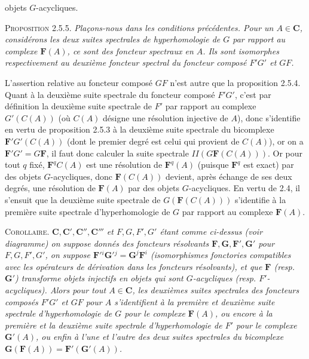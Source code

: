 
\noindent objets $G$-acycliques.

\textsc{Proposition 2.5.5.} \textit{Plaçons-nous dans les
conditions précédentes. Pour un $A\in \mathbf C$, considérons les deux suites
spectrales de hyperhomologie de $G$ par rapport au complexe $\mathbf F(A)$,
ce sont des foncteur spectraux en $A$. Ils sont isomorphes respectivement au
deuxième foncteur spectral du foncteur composé $F'G'$ et $GF$.}

L'assertion relative au foncteur composé $GF$ n'est autre que la proposition
2.5.4. Quant à la deuxième suite spectrale du foncteur composé $F'G'$, c'est
par définition la deuxième suite spectrale de $F'$ par rapport au complexe
$G'(C(A))$ (où $C(A)$ désigne une résolution injective de $A$), donc
s'identifie en vertu de proposition 2.5.3 à la deuxième suite spectrale du
bicomplexe $\mathbf F'G'(C(A))$ (dont le premier degré est celui qui provient
de $C(A)$), or on a $\mathbf F'G'=G\mathbf F$, il faut donc calculer la suite
spectrale $II(G\mathbf F(C(A)))$. Or pour tout $q$ fixé,
$\mathbf F^qC(A)$ est une résolution de $\mathbf F^q(A)$ (puisque
$\mathbf F^q$ est exact) par des objets $G$-acycliques, donc
$\mathbf F(C(A))$ devient, après échange de ses deux degrés, une résolution
de $\mathbf F(A)$ par des objets $G$-acycliques. En vertu de 2.4, il
s'ensuit que la deuxième suite spectrale de $G(\mathbf F(C(A)))$ s'identifie
à la première suite spectrale d'hyperhomologie de $G$ par rapport au complexe
$\mathbf F(A)$.

\textsc{Corollaire.} \textit{$\mathbf C,\mathbf C',\mathbf C'',\mathbf C'''$ et $F,G,F',G'$
étant comme ci-dessus \textup{(}voir diagramme\textup{)} on suppose donnés des foncteurs
résolvants $\mathbf F,\mathbf G,\mathbf F',\mathbf G'$ pour $F,G,F',G'$, on
suppose $\mathbf F'{}^i\mathbf G'{}^j=\mathbf G^j\mathbf F^i$ \textup{(}isomorphismes fonctories
compatibles avec les opérateurs de dérivation dans les foncteurs résolvants\textup{)},
et que $\mathbf F$ \textup{(}resp. $\mathbf G'$\textup{)} transforme objets injectifs en objets qui sont
$G$-acycliques \textup{(}resp. $F'$-acycliques\textup{)}. Alors pour tout $A\in \mathbf C$, les
deuxièmes suites spectrales des foncteurs composés $F'G'$ et $GF$ pour $A$
s'identifient à la première et deuxième suite spectrale d'hyperhomologie de
$G$ pour le complexe $\mathbf F(A)$, ou encore à la première et la deuxième
suite spectrale d'hyperhomologie de $F'$ pour le complexe $\mathbf G'(A)$, ou
enfin à l'une et l'autre des deux suites spectrales du bicomplexe
$\mathbf G(\mathbf F(A))=\mathbf F'(\mathbf G'(A))$.}

